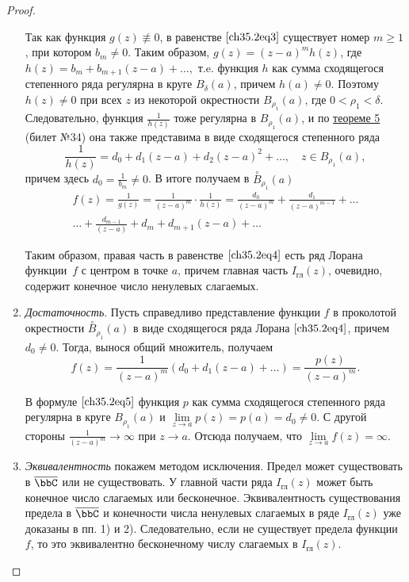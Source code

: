 \begin{proof}
\begin{enumerate}[wide, labelwidth=!, labelindent=\parindent]
Так как функция $g(z) \not\equiv 0$, в равенстве $\eqref{ch35.2eq3}$ существует номер $m \ge 1$, при котором $b_m \not= 0$. Таким образом, $g(z) = (z - a)^{m} h(z)$, где $h(z) = b_m + b_{m + 1} (z - a) + \ldots ,$ т.e. функция $h$ как сумма сходящегося степенного ряда регулярна в круге $B_{\delta}(a)$, причем $h(a) \not= 0$. Поэтому $h(z) \not= 0$ при всех $z$ из некоторой окрестности $B_{\rho_1}(a)$, где $0 < \rho_1 < \delta$. Следовательно, функция $\frac{1}{h(z)}$ тоже регулярна в $B_{\rho_1}(a)$, и  по \hyperref[abc29]{теореме 5} (билет №34) она также представима в виде сходящегося степенного ряда
$$
\frac{1}{h(z)} = d_0 + d_1 (z - a) + d_2 (z - a)^2 + \ldots , \quad z \in B_{\rho_1}(a),
$$
причем здесь $d_0 = \frac{1}{b_m} \not= 0$. В итоге получаем в $\overset{\circ}{B}_{\rho_1}(a)$
\begin{multline} \label{ch35.2eq4}
f(z) = \frac{1}{g(z)} = \frac{1}{(z - a)^m} \cdot \frac{1}{h(z)} = \frac{d_0}{(z - a)^m} + \frac{d_1}{(z - a)^{m - 1}} + \ldots \\ \ldots+ \frac{d_{m - 1}}{(z - a)} + d_m + d_{m + 1} (z - a) + \ldots 
\end{multline}

Таким образом, правая часть в равенстве $\eqref{ch35.2eq4}$ есть ряд Лорана функции~$f$ с центром в точке $a$, причем главная часть $I_{\text{гл}}(z)$, очевидно, содержит конечное число ненулевых слагаемых.

\item \textit{Достаточность}. Пусть справедливо представление функции $f$ в проколотой окрестности $\overset{\circ}{B}_{\rho_1}(a)$ в виде сходящегося ряда Лорана $\eqref{ch35.2eq4}$, причем $d_0 \not= 0$. Тогда, вынося общий множитель, получаем
\begin{equation} \label{ch35.2eq5}
f(z) = \frac{1}{(z - a)^m} (d_0 + d_1 (z - a) + \ldots) = \frac{p(z)}{(z - a)^m}.
\end{equation}

В формуле $\eqref{ch35.2eq5}$ функция $p$ как сумма сходящегося степенного ряда регулярна в круге $B_{\rho_1}(a)$ и $\lim\limits_{z \to a} p(z) = p(a) = d_0 \not= 0$. С другой стороны $\frac{1}{(z - a)^m} \to \infty$ при $z \to a$. Отсюда получаем, что $\lim\limits_{z \to a} f(z) = \infty$.

\item	\textit{Эквивалентность} покажем методом исключения. Предел может существовать в $\overline{\bbC}$ или не существовать. У главной части ряда $I_{\text{гл}}(z)$ может быть конечное число слагаемых или бесконечное. Эквивалентность существования предела в $\overline{\bbC}$ и конечности числа ненулевых слагаемых в ряде $I_{\text{гл}}(z)$ уже доказаны в пп. 1) и 2). Следовательно, если не существует предела функции $f$, то это эквивалентно бесконечному числу слагаемых в $I_{\text{гл}}(z)$.


\end{enumerate}
\end{proof}
